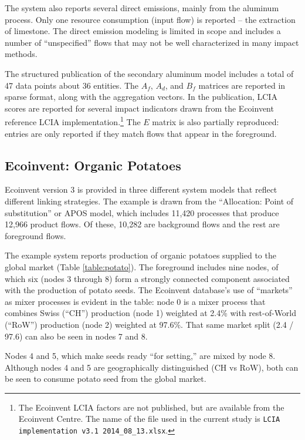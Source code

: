 The system also reports several direct emissions, mainly from the aluminum process.  Only one resource consumption (input flow) is reported -- the extraction of limestone. The direct emission modeling is limited in scope and includes a number of ``unspecified'' flows that may not be well characterized in many impact methods.

The structured publication of the secondary aluminum model includes a total of 47 data points about 36 entities.  The $A_f$, $A_d$, and $B_f$ matrices are reported in sparse format, along with the aggregation vectors. In the publication, LCIA scores are reported for several impact indicators drawn from the Ecoinvent reference LCIA implementation.\footnote{The Ecoinvent LCIA factors are not published, but are available from the Ecoinvent Centre. The name of the file used in the current study is \texttt{LCIA implementation v3.1 2014\_08\_13.xlsx}.}    The $E$ matrix is also partially reproduced: entries are only reported if they match flows that appear in the foreground.



\subsection{Ecoinvent: Organic Potatoes}



Ecoinvent version 3 is provided in three different system models that reflect different linking strategies.  The example is drawn from the ``Allocation: Point of substitution'' or APOS model, which includes 11,420 processes that produce 12,966 product flows.  Of these, 10,282 are background flows and the rest are foreground flows.

The example system reports production of organic potatoes supplied to the global market (Table \ref{table:potato}).  The foreground includes nine nodes, of which six (nodes 3 through 8) form a strongly connected component associated with the production of potato seeds.  The Ecoinvent database's use of ``markets'' as mixer processes is evident in the table: node 0 is a mixer process that combines Swiss (``CH'') production (node 1) weighted at 2.4\%  with rest-of-World (``RoW'') production (node 2) weighted at 97.6\%.  That same market split (2.4 / 97.6) can also be seen in nodes 7 and 8.

Nodes 4 and 5, which make seeds ready ``for setting,'' are mixed by node 8. Although nodes 4 and 5 are geographically distinguished (CH vs RoW), both can be seen to consume potato seed from the global market.

